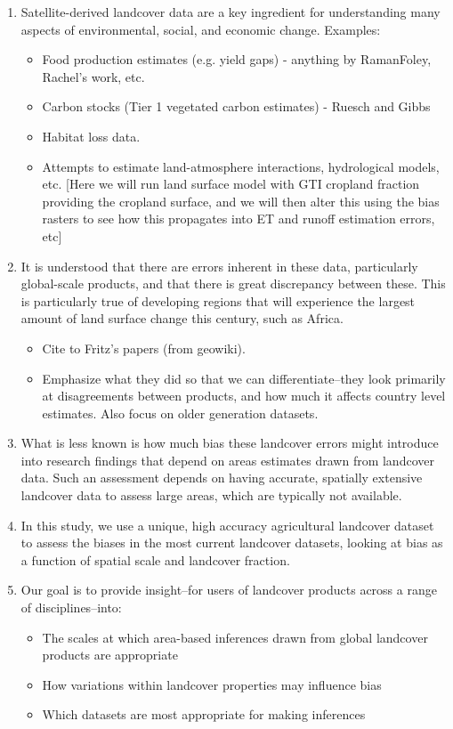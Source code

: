 \documentclass[11 pt]{article}
\begin{document}
\begin{enumerate}
  \item Satellite-derived landcover data are a key ingredient for understanding many aspects of environmental, social, and economic change. Examples:
    \begin{itemize}
      \item Food production estimates (e.g. yield gaps) - anything by RamanFoley, Rachel's work, etc.
      \item Carbon stocks (Tier 1 vegetated carbon estimates) - Ruesch and Gibbs
      \item Habitat loss data.
      \item Attempts to estimate land-atmosphere interactions, hydrological models, etc. [Here we will run land surface model with GTI cropland fraction providing the cropland surface, and we will then alter this using the bias rasters to see how this propagates into ET and runoff estimation errors, etc] 
    \end{itemize}
  \item It is understood that there are errors inherent in these data, particularly global-scale products, and that there is great discrepancy between these. This is particularly true of developing regions that will experience the largest amount of land surface change this century, such as Africa.  
    \begin{itemize} 
      \item Cite to Fritz's papers (from geowiki). 
      \item Emphasize what they did so that we can differentiate--they look primarily at disagreements between products, and how much it affects country level estimates. Also focus on older generation datasets. 
    \end{itemize}
  \item What is less known is how much bias these landcover errors might introduce into research findings that depend on areas estimates drawn from landcover data. Such an assessment depends on having accurate, spatially extensive landcover data to assess large areas, which are typically not available. 
  \item In this study, we use a unique, high accuracy agricultural landcover dataset to assess the biases in the most current landcover datasets, looking at bias as a function of spatial scale and landcover fraction.  
  \item Our goal is to provide insight--for users of landcover products across a range of disciplines--into: 
    \begin{itemize}
      \item The scales at which area-based inferences drawn from global landcover products are appropriate
      \item How variations within landcover properties may influence bias
      \item Which datasets are most appropriate for making inferences
    \end{itemize}
\end{enumerate}
\end{document}
